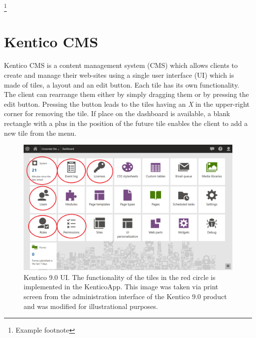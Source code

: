 \footnote{Example footnote}

\section{Kentico CMS} \label{analysisKenticoCMS}
Kentico CMS is a content management system (CMS) which allows clients to create and manage their web-sites using a single user interface (UI) which is made of tiles, a layout and an edit button. Each tile has its own functionality. The client can rearrange them either by simply dragging them or by pressing the edit button. Pressing the button leads to the tiles having an \textit{X} in the upper-right corner for removing the tile. If place on the dashboard is available, a blank rectangle with a plus in the position of the future tile enables the client to add a new tile from the menu. 

\begin{figure}[ht!]
  \centering
  \includegraphics[width=\textwidth]{Images/Kentico9.png}
  \caption{Kentico 9.0 UI. The functionality of the tiles in the red circle is implemented in the KenticoApp. This image was
taken via print screen from the administration interface of the Kentico 9.0 product and was modified for illustrational purposes.}
  \label{kentico9UI}
\end{figure} 


